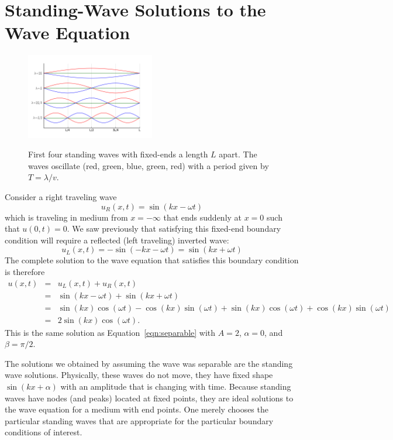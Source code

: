 \documentclass[12pt]{article}
\begin{document}
\section{Standing-Wave Solutions to the Wave Equation}

\begin{figure}[thb]
\begin{center}
{\includegraphics[width=0.50\textwidth]{figs/harmonics.png}}
\end{center}
\caption{\label{fig:harmonics} First four standing waves with fixed-ends a length $L$ apart.  The waves oscillate (red, green, blue, green, red) with a period given by $T = \lambda/v$.}
\end{figure}

\noindent
Consider a right traveling wave
\begin{equation}
u_R(x,t) = \sin(k x - \omega t)
\end{equation}
which is traveling in medium from $x = -\infty$ that ends suddenly at $x=0$ such that $u(0,t) = 0$.  We saw previously that satisfying this fixed-end boundary condition will require a reflected (left traveling) inverted wave:
\begin{equation}
u_L(x,t) = -\sin(-k x - \omega t) = \sin(k x + \omega t) 
\end{equation}
The complete solution to the wave equation that satisfies this boundary condition is therefore
\begin{eqnarray*}
u(x,t) & = & u_L(x,t) + u_R(x,t)  \\
& = &  \sin(k x - \omega t) + \sin(k x + \omega t)\\
& = &  \sin(k x) \cos( \omega t) - \cos(k x) \sin( \omega t) + \sin(k x) \cos( \omega t) + \cos(k x) \sin( \omega t) \\
& = & 2 \sin(k x ) \cos(\omega t).
\end{eqnarray*}
This is the same solution as Equation~\ref{eqn:separable} with $A=2$, $\alpha=0$, and $\beta=\pi/2$. 

The solutions we obtained by assuming the wave was separable are the standing wave solutions.  Physically, these waves do not move, they have fixed shape $\sin(kx+\alpha)$ with an amplitude that is changing with time.  Because standing waves have nodes (and peaks) located at fixed points, they are ideal solutions to the wave equation for a medium with end points.  One merely chooses the particular standing waves that are appropriate for the particular boundary conditions of interest.
\end{document}
